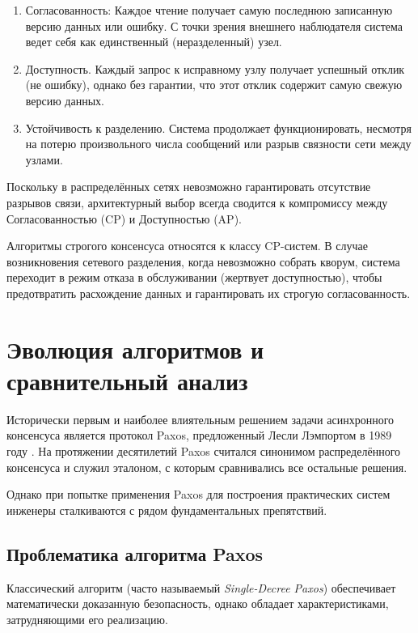 \begin{enumerate}
    \item Согласованность:
    Каждое чтение получает самую последнюю записанную версию данных или ошибку. С точки зрения внешнего наблюдателя система ведет себя как единственный (неразделенный) узел.

    \item Доступность.
    Каждый запрос к исправному узлу получает успешный отклик (не ошибку), однако без гарантии, что этот отклик содержит самую свежую версию данных.

    \item Устойчивость к разделению.
    Система продолжает функционировать, несмотря на потерю произвольного числа сообщений или разрыв связности сети между узлами.
\end{enumerate}

Поскольку в распределённых сетях невозможно гарантировать отсутствие разрывов связи, архитектурный выбор всегда сводится к компромиссу между Согласованностью (CP) и Доступностью (AP).

Алгоритмы строгого консенсуса относятся к классу CP-систем. В случае возникновения сетевого разделения, когда невозможно собрать кворум, система переходит в режим отказа в обслуживании (жертвует доступностью), чтобы предотвратить расхождение данных и гарантировать их строгую согласованность.

\section{Эволюция алгоритмов и сравнительный анализ}

Исторически первым и наиболее влиятельным решением задачи асинхронного консенсуса является протокол Paxos, предложенный Лесли Лэмпортом в 1989 году \cite{paxos_simple}. На протяжении десятилетий Paxos считался синонимом распределённого консенсуса и служил эталоном, с которым сравнивались все остальные решения.

Однако при попытке применения Paxos для построения практических систем инженеры сталкиваются с рядом фундаментальных препятствий.

\subsection{Проблематика алгоритма Paxos}

Классический алгоритм (часто называемый \textit{Single-Decree Paxos}) обеспечивает математически доказанную безопасность, однако обладает характеристиками, затрудняющими его реализацию.

